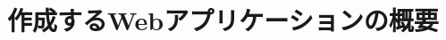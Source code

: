 \documentclass[main]{subfiles}
\begin{document}
\chapter{作成するWebアプリケーションの概要}
\label{cha:appcation_overview}
\end{document}

